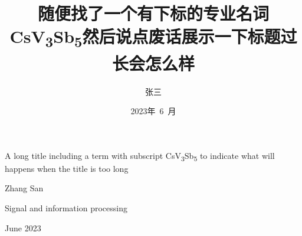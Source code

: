\title{
    随便找了一个有下标的专业名词CsV\textsubscript{3}Sb\textsubscript{5}然后说点废话展示一下标题过长会怎么样
}{
    A long title including a term with subscript CsV\textsubscript{3}Sb\textsubscript{5} to indicate what will happens when the title is too long
}
\author{张三}{Zhang San}
\subject{信号与信息处理}{Signal and information processing}
\date{2023年~6~月}{June 2023}